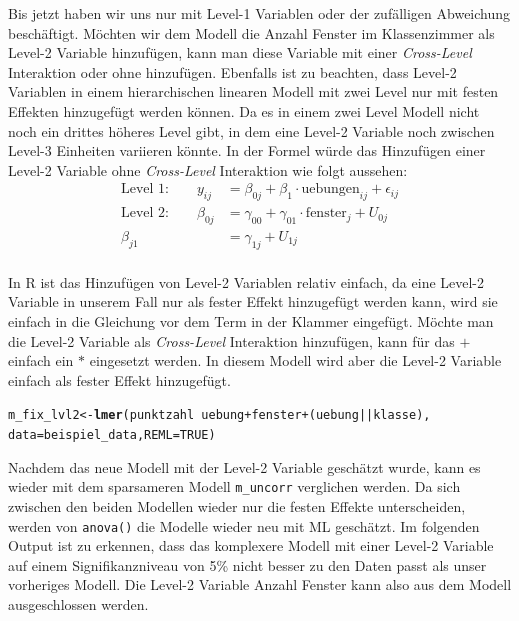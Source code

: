 \documentclass[12pt]{article}\usepackage[]{graphicx}\usepackage[]{color}
\makeatletter
\newcommand{\hlnum}[1]{\textcolor[rgb]{0.686,0.059,0.569}{#1}}%
\newcommand{\hlopt}[1]{\textcolor[rgb]{0,0,0}{#1}}%
\newcommand{\hlstd}[1]{\textcolor[rgb]{0.345,0.345,0.345}{#1}}%
\newcommand{\hlkwb}[1]{\textcolor[rgb]{0.69,0.353,0.396}{#1}}%
\newcommand{\hlkwc}[1]{\textcolor[rgb]{0.333,0.667,0.333}{#1}}%
\newcommand{\hlkwd}[1]{\textcolor[rgb]{0.737,0.353,0.396}{\textbf{#1}}}%
\newenvironment{kframe}{%
 \def\at@end@of@kframe{}%
 \ifinner\ifhmode%
  \def\at@end@of@kframe{\end{minipage}}%
  \begin{minipage}{\columnwidth}%
 \fi\fi%
 \def\FrameCommand##1{\hskip\@totalleftmargin \hskip-\fboxsep
 \colorbox{shadecolor}{##1}\hskip-\fboxsep
     \hskip-\linewidth \hskip-\@totalleftmargin \hskip\columnwidth}%
 \MakeFramed {\advance\hsize-\width
   \@totalleftmargin\z@ \linewidth\hsize
   \@setminipage}}%
 {\par\unskip\endMakeFramed%
 \at@end@of@kframe}
\newenvironment{knitrout}{}{} %
\makeatother
\begin{document}
Bis jetzt haben wir uns nur mit Level-1 Variablen oder der zufälligen Abweichung beschäftigt. Möchten wir dem Modell die Anzahl Fenster im Klassenzimmer als Level-2 Variable hinzufügen, kann man diese Variable mit einer \textit{Cross-Level} Interaktion oder ohne hinzufügen. Ebenfalls ist zu beachten, dass Level-2 Variablen in einem hierarchischen linearen Modell mit zwei Level nur mit festen Effekten hinzugefügt werden können. Da es in einem zwei Level Modell nicht noch ein drittes höheres Level gibt, in dem eine Level-2 Variable noch zwischen Level-3 Einheiten variieren könnte. In der Formel würde das Hinzufügen einer Level-2 Variable ohne \textit{Cross-Level} Interaktion wie folgt aussehen:
\begin{equation} 
\begin{split}	
 \text{Level 1:}  \qquad y_{ij} & = \beta_{0j} + \beta_{1} \cdot \text{uebungen}_{ij} + \epsilon_{ij}\\
 \text{Level 2:} \qquad \beta_{0j} & = \gamma_{00} + \gamma_{01} \cdot \text{fenster}_{j} + U_{0j}\\
 \beta_{j1} & = \gamma_{1j} + U_{1j}\\
\end{split}	
\end{equation} 

In R ist das Hinzufügen von Level-2 Variablen relativ einfach, da eine Level-2 Variable in unserem Fall nur als fester Effekt hinzugefügt werden kann, wird sie einfach in die Gleichung vor dem Term in der Klammer eingefügt. Möchte man die Level-2 Variable als \textit{Cross-Level} Interaktion hinzufügen, kann für das $+$ einfach ein $*$ eingesetzt werden. In diesem Modell wird aber die Level-2 Variable einfach als fester Effekt hinzugefügt.

\singlespacing
\begin{knitrout}
\color{fgcolor}\begin{kframe}
\begin{alltt}
\hlstd{m_fix_lvl2} \hlkwb{<-} \hlkwd{lmer}\hlstd{(punktzahl} \hlopt{~} \hlstd{uebung} \hlopt{+} \hlstd{fenster} \hlopt{+} \hlstd{(uebung} \hlopt{||} \hlstd{klasse),}
        \hlkwc{data} \hlstd{= beispiel_data,} \hlkwc{REML} \hlstd{=} \hlnum{TRUE}\hlstd{)}
\end{alltt}
\end{kframe}
\end{knitrout}

Nachdem das neue Modell mit der Level-2 Variable geschätzt wurde, kann es wieder mit dem sparsameren Modell \texttt{m\_uncorr} verglichen werden. Da sich zwischen den beiden Modellen wieder nur die festen Effekte unterscheiden, werden von \texttt{anova()} die Modelle wieder neu mit ML geschätzt. Im folgenden Output ist zu erkennen, dass das komplexere Modell mit einer Level-2 Variable auf einem Signifikanzniveau von 5\% nicht besser zu den Daten passt als unser vorheriges Modell. Die Level-2 Variable Anzahl Fenster kann also aus dem Modell ausgeschlossen werden.
\end{document}
